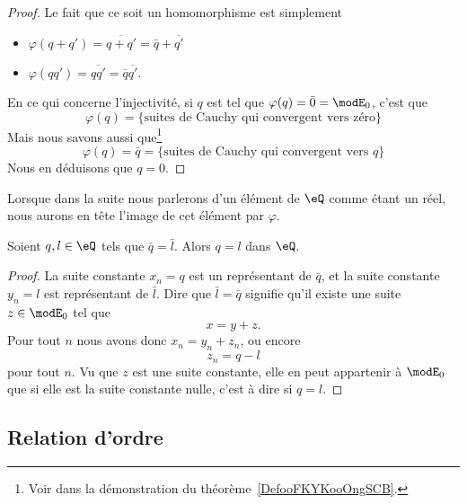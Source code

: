 \begin{proof}
    Le fait que ce soit un homomorphisme est simplement
    \begin{itemize}
        \item \( \varphi(q+q')=\overline{ q+q' }=\bar q+\overline{ q' }\)
        \item \( \varphi(qq')=\overline{ qq' }=\overline{ q }\overline{ q' }\).
    \end{itemize}
    En ce qui concerne l'injectivité, si \( q\) est tel que \( \varphi(q)=\bar 0=\modE_0\), c'est que
    \begin{equation}
        \varphi(q)=\{ \text{suites de Cauchy qui convergent vers zéro} \}
    \end{equation}
    Mais nous savons aussi que\footnote{Voir dans la démonstration du théorème~\ref{DefooFKYKooOngSCB}.}
    \begin{equation}
        \varphi(q)=\bar q=\{ \text{suites de Cauchy qui convergent vers } q \}
    \end{equation}
    Nous en déduisons que \( q=0\).
\end{proof}
Lorsque dans la suite nous parlerons d'un élément de \( \eQ\) comme étant un réel, nous aurons en tête l'image de cet élément par \( \varphi\).

\begin{lemma}       \label{LEMooYLQBooFistHs}
    Soient \( q,l\in \eQ\) tels que \( \bar q=\bar l\). Alors \( q=l\) dans \( \eQ\).
\end{lemma}

\begin{proof}
    La suite constante \( x_n=q\) est un représentant de \( \bar q\), et la suite constante \( y_n=l\) est représentant de \( \bar l\). Dire que \( \bar l=\bar q\) signifie qu'il existe une suite \( z\in \modE_0\) tel que 
    \begin{equation}
        x=y+z.
    \end{equation}
    Pour tout \( n\) nous avons donc \( x_n=y_n+z_n\), ou encore
    \begin{equation}
        z_n=q-l
    \end{equation}
    pour tout \( n\). Vu que \( z\) est une suite constante, elle en peut appartenir à \( \modE_0\) que si elle est la suite constante nulle, c'est à dire si \( q=l\).
\end{proof}

\subsection{Relation d'ordre}

